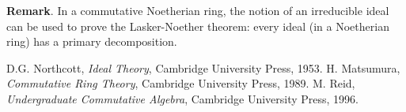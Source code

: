 \documentclass[12pt]{article}
\begin{document}
\textbf{Remark}.  In a commutative Noetherian ring, the notion of an irreducible ideal can be used to prove the Lasker-Noether theorem: every ideal (in a Noetherian ring) has a primary decomposition.

\begin{thebibliography}{9}
D.G. Northcott, \emph{Ideal Theory}, Cambridge University Press, 1953.
H. Matsumura, \emph{Commutative Ring Theory}, Cambridge University Press, 1989.
M. Reid, \emph{Undergraduate Commutative Algebra}, Cambridge University Press, 1996.
\end{thebibliography}
\end{document}
